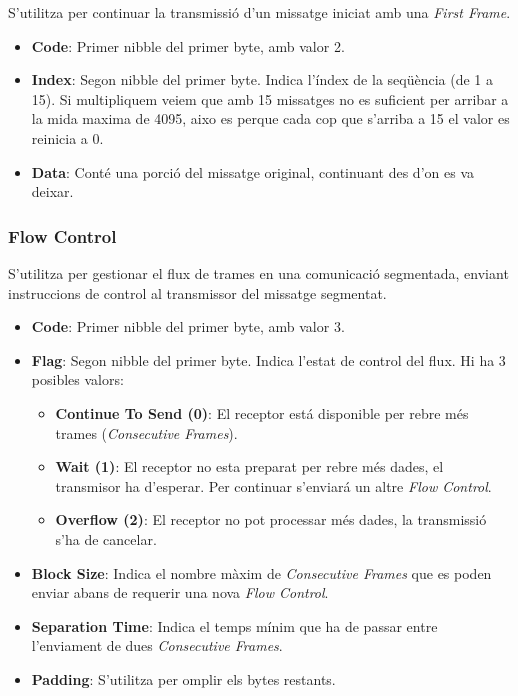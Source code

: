 \documentclass{tfgitic}[2024/07/01]
\begin{document}
S'utilitza per continuar la transmissió d'un missatge iniciat amb una \textit{First Frame}.

\begin{itemize}
  \item \textbf{Code}: Primer nibble del primer byte, amb valor 2.
  
  \item \textbf{Index}: Segon nibble del primer byte. Indica l'índex de la seqüència (de 1 a 15). Si multipliquem veiem que amb 15 missatges no es 
  suficient per arribar a la mida maxima de 4095, aixo es perque cada cop que s'arriba a 15 el valor es reinicia a 0. 
  
  \item \textbf{Data}: Conté una porció del missatge original, continuant des d'on es va deixar.
\end{itemize} 

\subsubsection{Flow Control}

S'utilitza per gestionar el flux de trames en una comunicació segmentada, enviant instruccions de control al transmissor del missatge segmentat.

\begin{itemize}
  \item \textbf{Code}: Primer nibble del primer byte, amb valor 3.
  
  \item \textbf{Flag}: Segon nibble del primer byte. Indica l'estat de control del flux. Hi ha 3 posibles valors: 
  \begin{itemize}
    \item \textbf{Continue To Send (0)}: El receptor está disponible per rebre més trames (\textit{Consecutive Frames}).
  
    \item \textbf{Wait (1)}: El receptor no esta preparat per rebre més dades, el transmisor ha d'esperar. Per continuar s'enviará un altre \textit{Flow Control}.
  
    \item \textbf{Overflow (2)}: El receptor no pot processar més dades, la transmissió s'ha de cancelar.
  \end{itemize} 
  
  \item \textbf{Block Size}: Indica el nombre màxim de \textit{Consecutive Frames} que es poden enviar abans de requerir una nova \textit{Flow Control}.
  
  \item \textbf{Separation Time}: Indica el temps mínim que ha de passar entre l'enviament de dues \textit{Consecutive Frames}.
  
  \item \textbf{Padding}: S'utilitza per omplir els bytes restants.
\end{itemize} 
\end{document}
